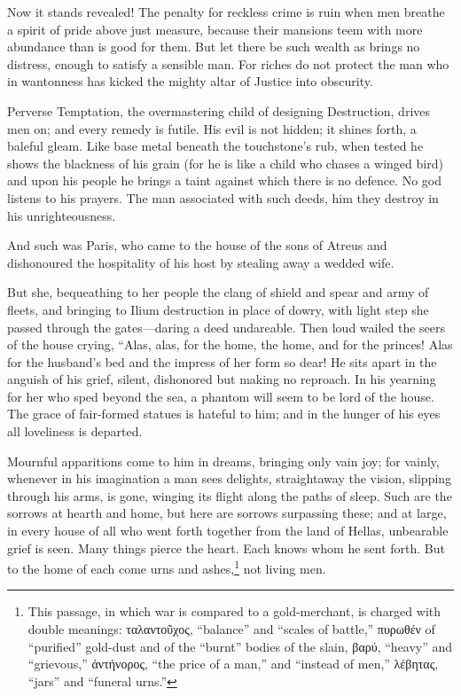 \documentclass[12pt]{article}
\begin{document}
Now it stands revealed! The penalty for reckless crime is ruin when men breathe a spirit of pride above just measure, because their mansions teem with more abundance than is good for them. But let there be such wealth as brings no distress, enough to satisfy a sensible man. For riches do not protect the man who in wantonness has kicked the mighty altar of Justice into obscurity.

Perverse Temptation, the overmastering child of designing Destruction, drives men on; and every remedy is futile. His evil is not hidden; it shines forth, a baleful gleam. Like base metal beneath the touchstone's rub, when tested he shows the blackness of his grain (for he is like a child who chases a winged bird) and upon his people he brings a taint against which there is no defence. No god listens to his prayers. The man associated with such deeds, him they destroy in his unrighteousness.

And such was Paris, who came to the house of the sons of Atreus and dishonoured the hospitality of his host by stealing away a wedded wife.

But she, bequeathing to her people the clang of shield and spear and army of fleets, and bringing to Ilium destruction in place of dowry, with light step she passed through the gates---daring a deed undareable. Then loud wailed the seers of the house crying, ``Alas, alas, for the home, the home, and for the princes! Alas for the husband's bed and the impress of her form so dear! He sits apart in the anguish of his grief, silent, dishonored but making no reproach. In his yearning for her who sped beyond the sea, a phantom will seem to be lord of the house. The grace of fair-formed statues is hateful to him; and in the hunger of his eyes all loveliness is departed.

Mournful apparitions come to him in dreams, bringing only vain joy; for vainly, whenever in his imagination a man sees delights, straightaway the vision, slipping through his arms, is gone, winging its flight along the paths of sleep. Such are the sorrows at hearth and home, but here are sorrows surpassing these; and at large, in every house of all who went forth together from the land of Hellas, unbearable grief is seen. Many things pierce the heart. Each knows whom he sent forth. But to the home of each come urns and ashes,\footnote{This passage, in which war is compared to a gold-merchant, is charged with double meanings: ταλαντοῦχος, ``balance'' and ``scales of battle,'' πυρωθέν of ``purified'' gold-dust and of the ``burnt'' bodies of the slain, βαρύ, ``heavy'' and ``grievous,'' ἀντήνορος, ``the price of a man,'' and ``instead of men,'' λέβητας, ``jars'' and ``funeral urns.''} not living men.
\end{document}
